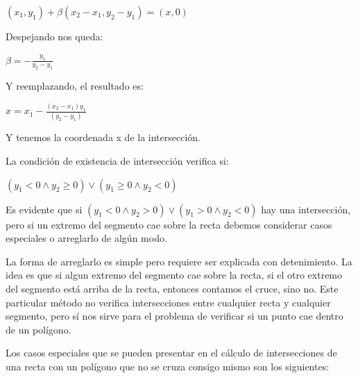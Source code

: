 \vspace{0.2cm}
$(x_1, y_1) + \beta(x_2 - x_1, y_2 - y_1) = (x, 0)$
\vspace{0.2cm}

Despejando nos queda:

\vspace{0.2cm}
$\beta = -\displaystyle\frac{y_1}{y_2 - y_1}$
\vspace{0.2cm}

Y reemplazando, el resultado es:

\vspace{0.2cm}
$x = x_1 -\displaystyle\frac{(x_2 - x_1)y_1}{(y_2 - y_1)}$
\vspace{0.2cm}

Y tenemos la coordenada x de la intersección.

La condición de existencia de intersección verifica si:

\vspace{0.2cm}
$( y_1 < 0 \wedge y_2 \ge 0 ) \vee ( y_1 \ge 0 \wedge y_2 < 0 )$
\vspace{0.2cm}

Es evidente que si $( y_1 < 0 \wedge y_2 > 0 ) \vee ( y_1 > 0 \wedge y_2 < 0 )$ hay una intersección, pero si un
extremo del segmento cae sobre la recta debemos considerar casos especiales o arreglarlo de algún modo.

La forma de arreglarlo es simple pero requiere ser explicada con detenimiento. La idea es que si algun
extremo del segmento cae sobre la recta, si el otro extremo del segmento está arriba de la recta, entonces
contamos el cruce, sino no. Este particular método no verifica intersecciones entre cualquier recta y
cualquier segmento, pero sí nos sirve para el problema de verificar si un punto cae dentro de un polígono.

Los casos especiales que se pueden presentar en el cálculo de intersecciones de una recta con un polígono
que no se cruza consigo mismo son los siguientes:

